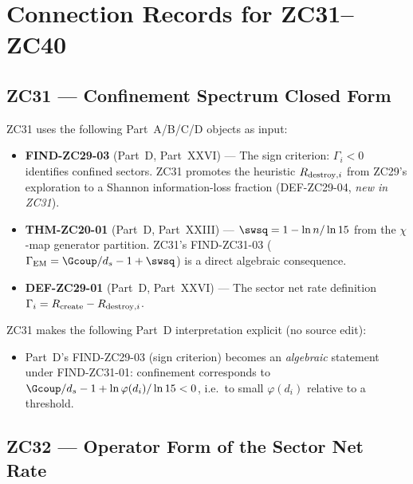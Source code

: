 \documentclass[12pt, a4paper]{article}
\begin{document}
\newpage

\section{Connection Records for ZC31--ZC40}

\subsection{ZC31 --- Confinement Spectrum Closed Form}
\label{cmap:zc31}

\begin{inheritbox}
ZC31 uses the following Part~A/B/C/D objects as input:
\begin{itemize}[noitemsep,leftmargin=1.5em]
  \item \textbf{FIND-ZC29-03} (Part~D, Part~XXVI) ---
    The sign criterion: $\Gamma_i < 0$ identifies confined sectors.
    ZC31 promotes the heuristic $R_{{\rm destroy},i}$ from
    ZC29's exploration to a Shannon information-loss fraction
    (DEF-ZC29-04, \emph{new in ZC31}).
  \item \textbf{THM-ZC20-01} (Part~D, Part~XXIII) ---
    $\swsq = 1 - \ln n/\ln 15$ from the $\chi$-map generator partition.
    ZC31's FIND-ZC31-03 ($\Gamma_{\rm EM} = \Gcoup/d_s - 1 + \swsq$)
    is a direct algebraic consequence.
  \item \textbf{DEF-ZC29-01} (Part~D, Part~XXVI) ---
    The sector net rate definition
    $\Gamma_i = R_{\rm create} - R_{{\rm destroy},i}$.
\end{itemize}
\end{inheritbox}

\begin{correctionbox}
ZC31 makes the following Part~D interpretation explicit (no source edit):
\begin{itemize}[noitemsep,leftmargin=1.5em]
  \item Part~D's FIND-ZC29-03 (sign criterion) becomes an
    \emph{algebraic} statement under FIND-ZC31-01: confinement
    corresponds to $\Gcoup/d_s - 1 + \ln\varphi(d_i)/\ln 15 < 0$,
    i.e.\ to small $\varphi(d_i)$ relative to a threshold.
\end{itemize}
\end{correctionbox}

\bigskip

\subsection{ZC32 --- Operator Form of the Sector Net Rate}
\label{cmap:zc32}
\end{document}
